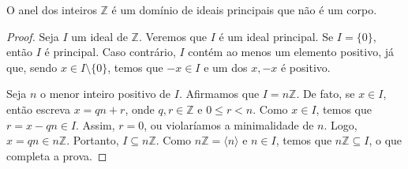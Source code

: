 \begin{prop} O anel dos inteiros $\mathbb Z$ é um domínio de ideais principais que não é um corpo.
\end{prop}
\begin{proof}
    Seja $I$ um ideal de $\mathbb Z$.
    Veremos que $I$ é um ideal principal.
    Se $I=\{0\}$, então $I$ é principal.
    Caso contrário, $I$ contém ao menos um elemento positivo, já que, sendo $x\in I\setminus\{0\}$, temos que $-x \in I$ e um dos $x, -x$ é positivo.

    Seja $n$ o menor inteiro positivo de $I$.
    Afirmamos que $I=n\mathbb Z$.
    De fato, se $x \in I$, então escreva $x=qn+r$, onde $q,r \in \mathbb Z$ e $0\leq r<n$.
    Como $x \in I$, temos que $r=x-qn \in I$. Assim, $r=0$, ou violaríamos a minimalidade de $n$.
    Logo, $x=qn\in n\mathbb Z$.
    Portanto, $I\subseteq n\mathbb Z$.
    Como $n\mathbb Z=\langle n\rangle$ e $n \in I$, temos que $n\mathbb Z\subseteq I$, o que completa a prova.
\end{proof}
